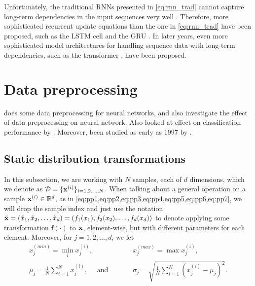 \documentclass{statsmsc}
\begin{document}
{Unfortunately, the traditional \acp{RNN} presented in \cref{eq:rnn_trad} cannot
capture long-term dependencies in the input sequences very well
\citep{long_term_dep}. Therefore, more sophisticated recurrent update equations
than the one in \cref{eq:rnn_trad} have been proposed, such as the \ac{LSTM}
cell \citep{lstm} and the \ac{GRU} \citep{gru_cho}.
In later years, even more sophisticated model architectures for handling sequence data with
long-term dependencies, such as the transformer \citep{attention}, have been proposed.


\section{Data preprocessing}%
\label{sec:Data preprocessing}

\cite{stanislav} does some data preprocessing for neural networks, and
\cite{nawi} also investigate the effect of data preprocessing on neural network.
Also looked at effect on classification performance by \cite{singh}.
Moreover, been studied as early as 1997 by \citep{preprocess_origin}.


\subsection{Static distribution transformations}%
\label{sub:Static distribution transformations}

In this subsection, we are working with $N$ samples, each of $d$ dimensions, which we
denote as $\mathcal{D}=\{\mathbf{x}^{(i)} \}_{i=1,2,\dots,N}$. When talking about a general operation
on a sample $\mathbf{x}^{(i)}\in\mathbb{R}^d$, as in \cref{eq:pp1,eq:pp2,eq:pp3,eq:pp4,eq:pp5,eq:pp6,eq:pp7},
we will drop the sample index and just use the notation
$\tilde{\mathbf{x}}=\left(\tilde{x}_1,\tilde{x}_2,\dots,\tilde{x}_d \right)
=(f_1(x_1), f_2(x_2),\dots,f_d(x_d))$ to denote applying some transformation $\mathbf{f}(\cdot)$ to
$\mathbf{x}$, element-wise, but with different parameters for each element.
Moreover, for $j=1,2,\dots,d$, we let
\begin{align}
    x_j^{(min)}=\min_i x^{(i)}_j,  \qquad\qquad&\quad
    x_j^{(max)}=\max x^{(i)}_j, \nonumber\\
    \mu_j = \frac{1}{N} \sum^{N}_{i=1} x^{(i)}_j, \quad
    \textrm{ and }&\quad
    \sigma_j = \sqrt{\frac{1}{N} \sum^{N}_{i=1} \left( x^{(i)}_j - \mu_j\right)^2}.
\end{align}

}
\end{document}
